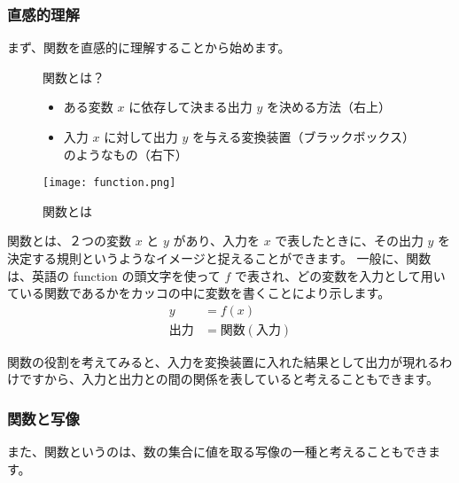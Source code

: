 \documentclass[uplatex,dvipdfmx,a4paper,11pt]{jsarticle}
\begin{document}
\subsubsection{直感的理解}
まず、関数を直感的に理解することから始めます。
\begin{figure}[htb]
	\begin{center}
		\begin{minipage}{0.5\textwidth}
			\large
			\begin{itembox}[l]{関数とは？}
				\begin{itemize}
					\item ある変数 $x$ に依存して決まる出力 $y$ を決める方法（右上）
					\item 入力 $x$ に対して出力 $y$ を与える変換装置（ブラックボックス）のようなもの（右下）
				\end{itemize}
			\end{itembox}
			
		\end{minipage}
		\begin{minipage}{0.4\textwidth}
			\begin{center}
			\texttt{[image: function.png]}
			\end{center}
		\end{minipage}
		\caption{関数とは}
		\label{function}
	\end{center}
\end{figure}

関数とは、２つの変数 $x$ と $y$ があり、入力を $x$ で表したときに、その出力 $y$ を決定する規則というようなイメージと捉えることができます。
一般に、関数は、英語の function の頭文字を使って $f$ で表され、どの変数を入力として用いている関数であるかをカッコの中に変数を書くことにより示します。
\begin{align*}
	y&=f(x) \\
	\text{出力}&=\text{関数} \left(\text{入力} \right)
\end{align*}

関数の役割を考えてみると、入力を変換装置に入れた結果として出力が現れるわけですから、入力と出力との間の関係を表していると考えることもできます。

\subsubsection{関数と写像}
また、関数というのは、数の集合に値を取る写像の一種と考えることもできます。
\end{document}
